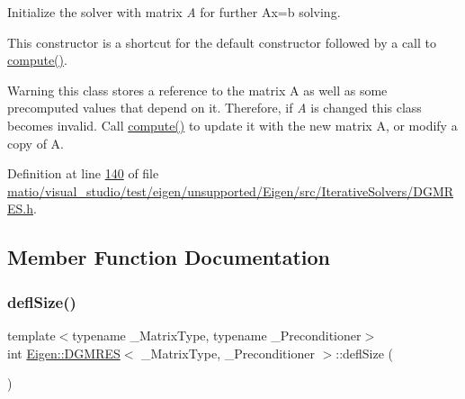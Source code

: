 Initialize the solver with matrix {\itshape A} for further {\ttfamily Ax=b} solving.

This constructor is a shortcut for the default constructor followed by a call to \hyperlink{group___iterative_linear_solvers___module_a7dfa55c55e82d697bde227696a630914}{compute()}.

\begin{DoxyWarning}{Warning}
this class stores a reference to the matrix A as well as some precomputed values that depend on it. Therefore, if {\itshape A} is changed this class becomes invalid. Call \hyperlink{group___iterative_linear_solvers___module_a7dfa55c55e82d697bde227696a630914}{compute()} to update it with the new matrix A, or modify a copy of A. 
\end{DoxyWarning}


Definition at line \hyperlink{matio_2visual__studio_2test_2eigen_2unsupported_2_eigen_2src_2_iterative_solvers_2_d_g_m_r_e_s_8h_source_l00140}{140} of file \hyperlink{matio_2visual__studio_2test_2eigen_2unsupported_2_eigen_2src_2_iterative_solvers_2_d_g_m_r_e_s_8h_source}{matio/visual\+\_\+studio/test/eigen/unsupported/\+Eigen/src/\+Iterative\+Solvers/\+D\+G\+M\+R\+E\+S.\+h}.



\subsection{Member Function Documentation}
\mbox{\label{class_eigen_1_1_d_g_m_r_e_s_a724f0f2f124376c3694fd69c59a88d5a}} 
\subsubsection{\texorpdfstring{defl\+Size()}{deflSize()}\hspace{0.1cm}{\footnotesize\ttfamily [1/2]}}
{\footnotesize\ttfamily template$<$typename \+\_\+\+Matrix\+Type, typename \+\_\+\+Preconditioner$>$ \\
int \hyperlink{class_eigen_1_1_d_g_m_r_e_s}{Eigen\+::\+D\+G\+M\+R\+ES}$<$ \+\_\+\+Matrix\+Type, \+\_\+\+Preconditioner $>$\+::defl\+Size (\begin{DoxyParamCaption}{ }\end{DoxyParamCaption})\hspace{0.3cm}{\ttfamily [inline]}}

